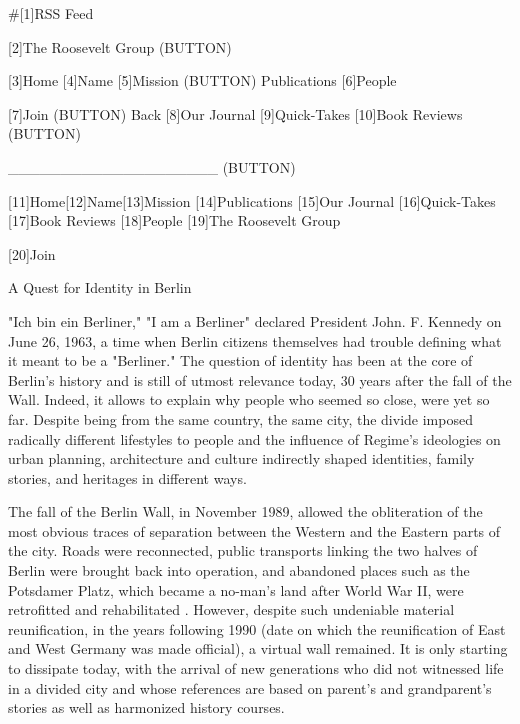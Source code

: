    #[1]RSS Feed

   [2]The Roosevelt Group
   (BUTTON)

   [3]Home [4]Name [5]Mission (BUTTON) Publications [6]People

   [7]Join
   (BUTTON) Back [8]Our Journal [9]Quick-Takes [10]Book Reviews
   (BUTTON)

   ____________________ (BUTTON)

   [11]Home[12]Name[13]Mission [14]Publications [15]Our Journal
   [16]Quick-Takes [17]Book Reviews [18]People
   [19]The Roosevelt Group

   [20]Join

A Quest for Identity in Berlin


   "Ich bin ein Berliner," "I am a Berliner" declared President John. F.
   Kennedy on June 26, 1963, a time when Berlin citizens themselves had
   trouble defining what it meant to be a "Berliner." The question of
   identity has been at the core of Berlin's history and is still of
   utmost relevance today, 30 years after the fall of the Wall.  Indeed,
   it allows to explain why people who seemed so close, were yet so far.
   Despite being from the same country, the same city, the divide imposed
   radically different lifestyles to people and the influence of Regime's
   ideologies on urban planning, architecture and culture indirectly
   shaped identities, family stories, and heritages in different ways.

   The fall of the Berlin Wall, in November 1989, allowed the obliteration
   of the most obvious traces of separation between the Western and the
   Eastern parts of the city. Roads were reconnected, public transports
   linking the two halves of Berlin were brought back into operation, and
   abandoned places such as the Potsdamer Platz, which became a no-man's
   land after World War II, were retrofitted and rehabilitated . However,
   despite such undeniable material reunification, in the years following
   1990 (date on which the reunification of East and West Germany was made
   official), a virtual wall remained. It is only starting to dissipate
   today, with the arrival of new generations who did not witnessed life
   in a divided city and whose references are based on parent's and
   grandparent's stories as well as harmonized history courses.

